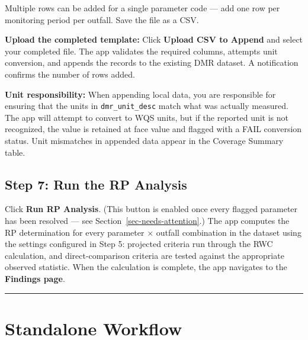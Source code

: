 \documentclass[
  11pt,
  letterpaper,
  DIV=11,
  numbers=noendperiod]{scrartcl}
\begin{document}
Multiple rows can be added for a single parameter code --- add one row
per monitoring period per outfall. Save the file as a CSV.

\textbf{Upload the completed template:} Click \textbf{Upload CSV to
Append} and select your completed file. The app validates the required
columns, attempts unit conversion, and appends the records to the
existing DMR dataset. A notification confirms the number of rows added.

\begin{tcolorbox}[enhanced jigsaw, arc=.35mm, bottomrule=.15mm, bottomtitle=1mm, breakable, colback=white, colbacktitle=quarto-callout-warning-color!10!white, colframe=quarto-callout-warning-color-frame, coltitle=black, left=2mm, leftrule=.75mm, opacityback=0, opacitybacktitle=0.6, rightrule=.15mm, title=\textcolor{quarto-callout-warning-color}{\faExclamationTriangle}\hspace{0.5em}{Warning}, titlerule=0mm, toprule=.15mm, toptitle=1mm]

\textbf{Unit responsibility:} When appending local data, you are
responsible for ensuring that the units in \texttt{dmr\_unit\_desc}
match what was actually measured. The app will attempt to convert to WQS
units, but if the reported unit is not recognized, the value is retained
at face value and flagged with a FAIL conversion status. Unit mismatches
in appended data appear in the Coverage Summary table.

\end{tcolorbox}

\subsection{Step 7: Run the RP Analysis}\label{sec-run-rp}

Click \textbf{Run RP Analysis}. (This button is enabled once every
flagged parameter has been resolved --- see
Section~\ref{sec-needs-attention}.) The app computes the RP
determination for every parameter × outfall combination in the dataset
using the settings configured in Step 5: projected criteria run through
the RWC calculation, and direct-comparison criteria are tested against
the appropriate observed statistic. When the calculation is complete,
the app navigates to the \textbf{Findings page}.

\begin{center}\rule{0.5\linewidth}{0.5pt}\end{center}

\section{Standalone Workflow}\label{sec-standalone-workflow}
\end{document}
